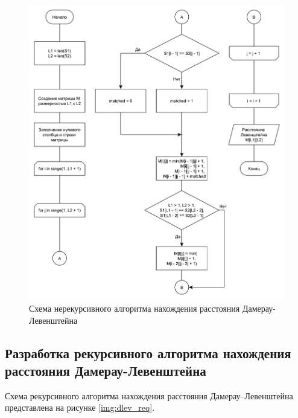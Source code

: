\begin{figure}[h]
	\centering
	\includegraphics[scale=0.6]{images/dlev.pdf}
	\caption{Схема нерекурсивного алгоритма нахождения расстояния Дамерау-Левенштейна}
	\label{img:dlev}
\end{figure}


\subsection{Разработка рекурсивного алгоритма нахождения расстояния Дамерау-Левенштейна}

Схема рекурсивного алгоритма нахождения расстояния Дамерау--Левенштейна представлена на рисунке \ref{img:dlev_req}.

